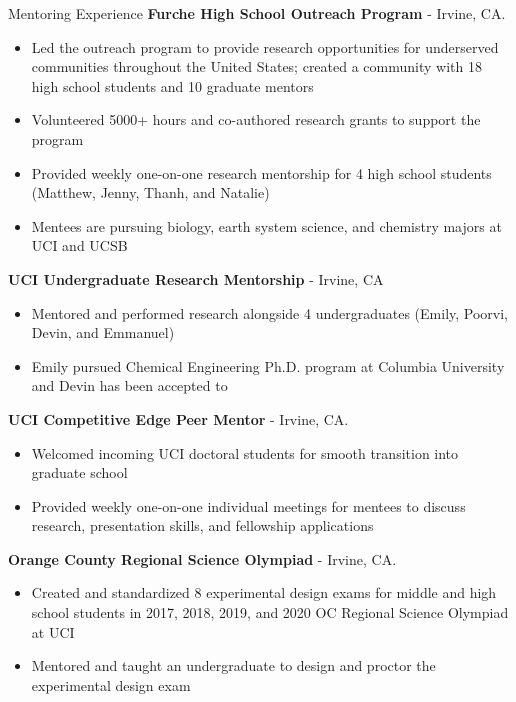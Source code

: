 \begin{rubric}{Mentoring Experience}
   \textbf{Furche High School Outreach Program} - Irvine, CA.
  \vspace{-0.5em}
   \begin{itemize}
     \itemsep-0.5em
   \item Led the outreach program to provide research opportunities for underserved communities
     throughout the United States; created a community with 18 high school students and
     10 graduate mentors
   \item Volunteered 5000+ hours and co-authored research grants to support the program
   \item Provided weekly one-on-one research mentorship for 4 high school students
     (Matthew, Jenny, Thanh, and Natalie)
   \item Mentees are pursuing biology, earth system science, and chemistry majors at UCI
    and UCSB
     \vspace{-1em}
   \end{itemize}
    \textbf{UCI Undergraduate Research Mentorship} - Irvine, CA
   \vspace{-0.5em}
   \begin{itemize}
     \itemsep-0.5em
   \item Mentored and performed research alongside 4 undergraduates (Emily, Poorvi, Devin,
     and Emmanuel)
   \item Emily pursued Chemical Engineering Ph.D. program at Columbia University and
     Devin has been accepted to 
     \vspace{-1em}
   \end{itemize}
   
    \textbf{UCI Competitive Edge Peer Mentor} - Irvine, CA.
   \vspace{-0.5em}
   \begin{itemize}
   \itemsep-0.5em
   \item Welcomed incoming UCI doctoral students for smooth transition into graduate school
   \item Provided weekly one-on-one individual meetings for mentees to discuss research, presentation
     skills, and fellowship applications
     \vspace{-1em}
   \end{itemize}
    \textbf{Orange County Regional Science Olympiad} - Irvine, CA.
   \vspace{-0.5em}
   \begin{itemize}
   \itemsep-0.5em
   \item Created and standardized 8 experimental design exams for middle and high school students in
     2017, 2018, 2019, and 2020 OC Regional Science Olympiad at UCI
   \item Mentored and taught an undergraduate to design and proctor the experimental design exam
     \vspace{-1em}
   \end{itemize}
\end{rubric}

%

